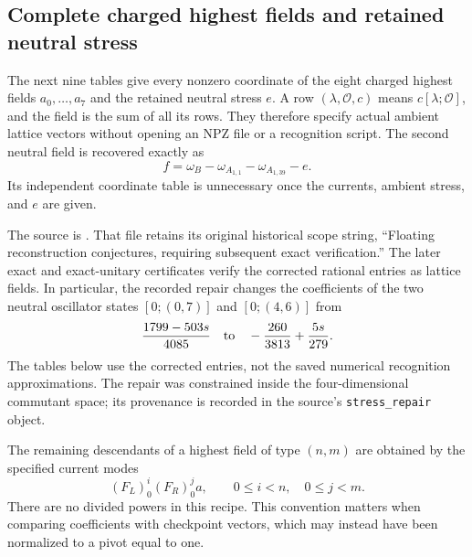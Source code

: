 \subsection{Complete charged highest fields and retained neutral stress}
\label{expfinite:complete-fields}

The next nine tables give every nonzero coordinate of the eight
charged highest fields $a_0,\ldots,a_7$ and the retained neutral stress
$e$. A row $(\lambda,\mathcal O,c)$ means $c[\lambda;\mathcal O]$,
and the field is the sum of all its rows. They therefore specify actual
ambient lattice vectors without opening an NPZ file or a recognition
script. The second neutral field is recovered exactly as
\[
 f=\omega_B-\omega_{A_{1,1}}-\omega_{A_{1,39}}-e.
\]
Its independent coordinate table is unnecessary once the currents,
ambient stress, and $e$ are given.

The source is .
That file retains its original historical scope string, ``Floating
reconstruction conjectures, requiring subsequent exact verification.''
The later exact and exact-unitary certificates verify the corrected
rational entries as lattice fields. In particular, the recorded repair
changes the coefficients of the two neutral oscillator states
$[0;(0,7)]$ and $[0;(4,6)]$ from
\[
 \frac{1799-503s}{4085}
 \quad\hbox{to}\quad
 -\frac{260}{3813}+\frac{5s}{279}.
\]
The tables below use the corrected entries, not the saved numerical
recognition approximations. The repair was constrained inside the
four-dimensional commutant space; its provenance is recorded in the
source's \texttt{stress\_repair} object.

The remaining descendants of a highest field of type $(n,m)$ are
obtained by the specified current modes
\[
 (F_L)_0^i(F_R)_0^j a,
 \qquad 0\le i<n,\quad 0\le j<m.
\]
There are no divided powers in this recipe. This convention matters
when comparing coefficients with checkpoint vectors, which may instead
have been normalized to a pivot equal to one.

